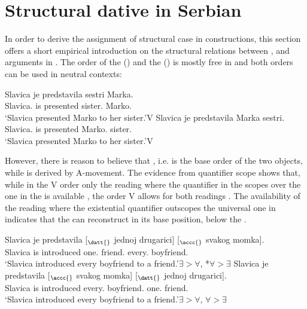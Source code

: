 \documentclass[output=paper,modfonts,newtxmath,hidelinks]{langscibook}
\begin{document}
\section{Structural dative in Serbian}

In order to derive the assignment of structural  case in  constructions, this section offers a short empirical introduction on the structural relations between \nomm, \accc{} and \datt{} arguments in . The order of the  () and the  () is mostly free in  and both orders can be used in neutral contexts:

\ea\label{16:doubleobject1}
\ea\label{16:doubleobject1a} \gll Slavica je predstavila sestri Marka.\\
Slavica.\nomm{} is presented sister.\datt{} Marko.\accc\\
\glt `Slavica presented Marko to her sister.'\hfill V \before{} \datt{} \before{} \accc{}
\ex \label{16:doubleobject1b}\gll Slavica je predstavila Marka sestri.\\
Slavica.\nomm{} is presented Marko.\accc{} sister.\datt{}\\
\glt `Slavica presented Marko to her sister.'\hfill V \before{} \accc{} \before{} \datt{}
\z \z

\noindent However, there is reason to believe that  \before{} , i.e.  is the base order of the two objects, while  is derived by A-movement. The evidence from quantifier scope \citep{aoun89,frey1989,bruening2001} shows that,  while in the V \before{} \datt{} \before{} \accc{} order only the reading where the quantifier in the  scopes over the one in the  is available , the order V \before{} \accc{} \before{} \datt{} allows for both readings . The availability of the reading where the existential quantifier outscopes the universal one in  indicates that the  can reconstruct in its base position, below the . 

\ea\label{16:ex8} 
\ea\label{16:ex8a}\gll Slavica je predstavila [$_{\datt{}}$ jednoj drugarici] [$_{\accc{}}$ svakog momka].\\
Slavica is introduced {} one.\datt{} friend.\datt{} {} every.\accc{} boyfriend.\accc\\
\glt `Slavica introduced every boyfriend to a friend.'\hfill  $\exists>\forall$, *$\forall>\exists$ 
\ex\label{16:quantifierscope}\gll Slavica je predstavila [$_{\accc{}}$ svakog momka] [$_{\datt{}}$ jednoj drugarici].\\
Slavica is introduced {} every.\accc{} boyfriend.\accc{} {} one.\datt{} friend.\datt\\
\glt `Slavica introduced every boyfriend to a friend.'\hfill $\exists>\forall$, $\forall>\exists$ 
\z \z
\end{document}
